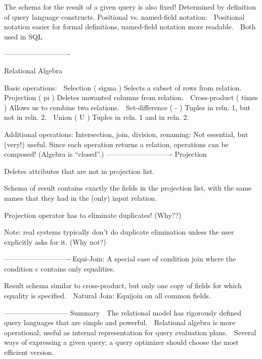 The schema for the result of a given query is also fixed! Determined by definition of query language 
constructs.
   Positional vs. named-field notation:  
  Positional notation easier for formal definitions, 
named-field notation more readable.  
 Both used in SQL

----------------------------

Relational Algebra

Basic operations:
 Selection ( sigma )    Selects a subset of rows from relation.
 Projection ( pi    )   Deletes unwanted columns from relation.
 Cross-product (  times   )  Allows us to combine two relations.
 Set-difference (  -   ) Tuples in reln. 1, but not in reln. 2.
 Union (  U   ) Tuples in reln. 1 and in reln. 2.

Additional operations:
Intersection, join, division, renaming:  Not essential, but (very!) useful.
Since each operation returns a relation, operations can be composed! (Algebra is “closed”.)
----------------------------
Projection

Deletes attributes that are not in projection list.

Schema of result contains exactly the fields in the projection list, 
with the same names that they had in the (only) input relation.

Projection operator has to eliminate duplicates!  (Why??)

Note: real systems typically don’t do duplicate elimination unless the user explicitly asks 
for it.  (Why not?)

----------------------------
Equi-Join:  A special case of condition join where 
the condition c contains only equalities.

Result schema similar to cross-product, but only 
one copy of fields for which equality is specified.
 Natural Join: Equijoin on all common fields.

---------------------------
Summary
 The relational model has rigorously defined query languages that are simple and powerful.
 Relational algebra is more operational; useful as internal representation for query evaluation plans.
 Several ways of expressing a given query; a query optimizer should choose the most efficient version.
